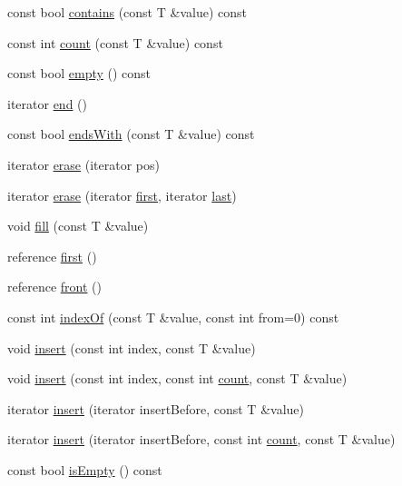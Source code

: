 \begin{DoxyCompactItemize}
\item 
const bool \hyperlink{namespaceprism_aec550341cf4587d3a0afaa9492e77503}{contains} (const T \&value) const 
\item 
const int \hyperlink{namespaceprism_a02873ae9088199948854cc05b20831c5}{count} (const T \&value) const 
\item 
const bool \hyperlink{namespaceprism_a7441180af2d914cc54ac35aead6ed030}{empty} () const 
\item 
iterator \hyperlink{namespaceprism_a8976ba2aea6612a03f75a390f40daef8}{end} ()
\item 
const bool \hyperlink{namespaceprism_abfc42fa48a8be97e541b137e9ae83c18}{ends\+With} (const T \&value) const 
\item 
iterator \hyperlink{namespaceprism_a46f69cc5e78e0a7bcd2d9a7ed9c05a8b}{erase} (iterator pos)
\item 
iterator \hyperlink{namespaceprism_ab853ba84b4ed547730d02a8c21328e65}{erase} (iterator \hyperlink{namespaceprism_ae3fb7a1926a9e8e59300cd5e370470da}{first}, iterator \hyperlink{namespaceprism_abe4956c4e865f55ca126b7fb973b5078}{last})
\item 
void \hyperlink{namespaceprism_ab76b40745e46fbda01eb55d8258ff498}{fill} (const T \&value)
\item 
reference \hyperlink{namespaceprism_ae3fb7a1926a9e8e59300cd5e370470da}{first} ()
\item 
reference \hyperlink{namespaceprism_a0c27e6535264895614b87eefa337404d}{front} ()
\item 
const int \hyperlink{namespaceprism_a78b6d3259343e632ab4e9d806498ac92}{index\+Of} (const T \&value, const int from=0) const 
\item 
void \hyperlink{namespaceprism_af52510a241330236aa7202abf65c6dcb}{insert} (const int index, const T \&value)
\item 
void \hyperlink{namespaceprism_abd912a072952b08ebd1009abbede3ee5}{insert} (const int index, const int \hyperlink{namespaceprism_a024117fc3639cdf6598509edf22f034a}{count}, const T \&value)
\item 
iterator \hyperlink{namespaceprism_a391f88be142a74df98c77632bb8352af}{insert} (iterator insert\+Before, const T \&value)
\item 
iterator \hyperlink{namespaceprism_a414531a413ed8c90d951f6fd94ac5535}{insert} (iterator insert\+Before, const int \hyperlink{namespaceprism_a024117fc3639cdf6598509edf22f034a}{count}, const T \&value)
\item 
const bool \hyperlink{namespaceprism_a538f7dd7bdd8d7963b39a9aea232a598}{is\+Empty} () const 

\end{DoxyCompactItemize}
